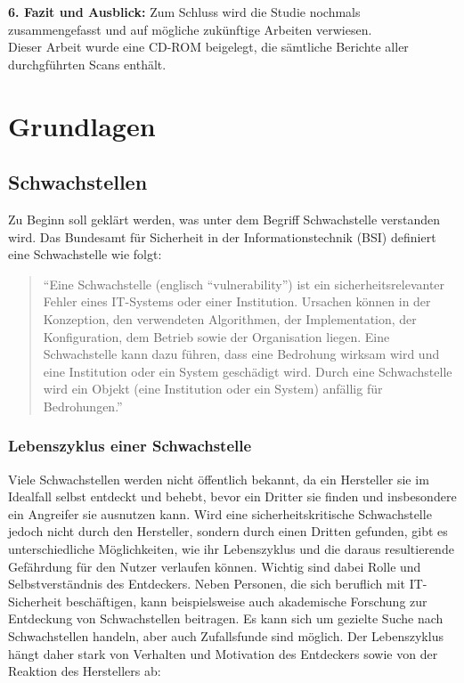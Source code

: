\documentclass[12pt,oneside,a4paper,parskip]{scrbook}
\begin{document}
\textbf{6. Fazit und Ausblick:} Zum Schluss wird die Studie nochmals zusammengefasst und auf mögliche zukünftige Arbeiten verwiesen.\\

Dieser Arbeit wurde eine CD-ROM beigelegt, die sämtliche Berichte aller durchgführten Scans enthält.

\chapter{Grundlagen}
  \section{Schwachstellen}
  Zu Beginn soll geklärt werden, was unter dem Begriff Schwachstelle verstanden wird. Das Bundesamt für Sicherheit in der Informationstechnik (BSI) definiert eine Schwachstelle wie folgt:

  \begin{quote}``Eine Schwachstelle (englisch ``vulnerability'') ist ein sicherheitsrelevanter Fehler eines IT-Systems oder einer Institution. Ursachen können in der Konzeption, den verwendeten Algorithmen, der Implementation, der Konfiguration, dem Betrieb sowie der Organisation liegen. Eine Schwachstelle kann dazu führen, dass eine Bedrohung wirksam wird und eine Institution oder ein System geschädigt wird. Durch eine Schwachstelle wird ein Objekt (eine Institution oder ein System) anfällig für Bedrohungen.'' \cite{BSI2}
  \end{quote}
   \subsection{Lebenszyklus einer Schwachstelle}
   Viele Schwachstellen werden nicht öffentlich bekannt, da ein Hersteller sie im Idealfall
   selbst entdeckt und behebt, bevor ein Dritter sie finden und insbesondere ein Angreifer
  sie ausnutzen kann.
  Wird eine sicherheitskritische Schwachstelle jedoch nicht durch den Hersteller, sondern
  durch einen Dritten gefunden, gibt es unterschiedliche Möglichkeiten, wie ihr Lebenszyklus und die daraus resultierende Gefährdung für den Nutzer verlaufen können.
  Wichtig sind dabei Rolle und Selbstverständnis des Entdeckers. Neben Personen, die
  sich beruflich mit IT-Sicherheit beschäftigen, kann beispielsweise auch akademische
  Forschung zur Entdeckung von Schwachstellen beitragen. Es kann sich um gezielte Suche nach Schwachstellen handeln, aber auch Zufallsfunde sind möglich.
  Der Lebenszyklus hängt daher stark von Verhalten und Motivation des Entdeckers sowie von der Reaktion des Herstellers ab:
\end{document}
